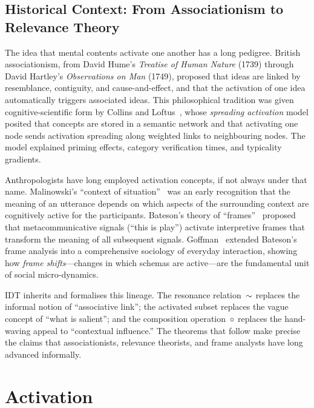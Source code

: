 \subsection*{Historical Context: From Associationism to Relevance Theory}

The idea that mental contents activate one another has a long
pedigree.  British associationism, from David Hume's \emph{Treatise of
Human Nature} (1739) through David Hartley's \emph{Observations on
Man} (1749), proposed that ideas are linked by resemblance, contiguity,
and cause-and-effect, and that the activation of one idea
automatically triggers associated ideas.  This philosophical tradition
was given cognitive-scientific form by Collins and
Loftus~\cite{collins1975}, whose \emph{spreading activation} model
posited that concepts are stored in a semantic network and that
activating one node sends activation spreading along weighted links to
neighbouring nodes.  The model explained priming effects, category
verification times, and typicality gradients.

Anthropologists have long employed activation concepts, if not always
under that name.  Malinowski's ``context of
situation''~\cite{malinowski1923} was an early recognition that the
meaning of an utterance depends on which aspects of the surrounding
context are cognitively active for the participants.  Bateson's theory
of ``frames''~\cite{bateson1972} proposed that metacommunicative
signals (``this is play'') activate interpretive frames that transform
the meaning of all subsequent signals.  Goffman~\cite{goffman1974}
extended Bateson's frame analysis into a comprehensive sociology of
everyday interaction, showing how \emph{frame shifts}---changes in
which schemas are active---are the fundamental unit of social
micro-dynamics.

IDT inherits and formalises this lineage.  The resonance
relation~$\sim$ replaces the informal notion of ``associative link'';
the activated subset replaces the vague concept of ``what is salient'';
and the composition operation~$\circ$ replaces the hand-waving
appeal to ``contextual influence.''  The theorems that follow make
precise the claims that associationists, relevance theorists, and
frame analysts have long advanced informally.

\section{Activation}
\label{sec:ch4:activation}

